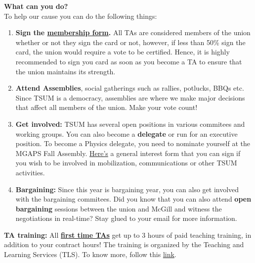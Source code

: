 \noindent \textbf{\sffamily What can you do?}\\
To help our cause you can do the following things: \\
    \begin{enumerate}
    \item \textbf{Sign the \href{https://tsum-stsem.ca/members/membership-forms/}{membership form}.} All TAs are considered members of the union whether or not they sign the card or not, however, if less than 50\% sign the card, the union would require a vote to be certified. Hence, it is highly recommended to sign you card as soon as you become a TA to ensure that the union maintains its strength.  \\ 
    
    \item \textbf{Attend Assemblies}, social gatherings such as rallies, potlucks, BBQs etc. Since TSUM is a democracy, assemblies are where we make major decisions that affect all members of the union. Make your vote count! \\
    
    \item \textbf{Get involved:} TSUM has several open positions in various commitees and working groups. You can also become a \textbf{delegate} or run for an executive position. To become a Physics delegate, you need to nominate yourself at the MGAPS Fall Assembly. \href{https://docs.google.com/forms/d/e/1FAIpQLSd1uaNmDgvsz2AEtq9MbR7N8De4p6-33g2jSGqGDNHRUkmbfA/viewform}{Here's} a general interest form that you can sign if you wish to be involved in mobilization, communications or other TSUM activities.\\
    
    \item \textbf{Bargaining:} Since this year is bargaining year, you can also get involved with the bargaining commitees. Did you know that you can also attend \textbf{open bargaining} sessions between the union and McGill and witness the negotiations in real-time? Stay glued to your email for more information.\\
\end{enumerate}

  \begin{plainexercise}
        \textbf{TA training:} All \textbf{\underline{first time TAs}} get up to 3 hours of paid teaching training, in addition to your contract hours! The training is organized by the Teaching and Learning Services (TLS). To know more, follow this \href{https://www.mcgill.ca/teaching-academic-programs/instructors/programming/ta-training}{link}.
    \end{plainexercise} 


